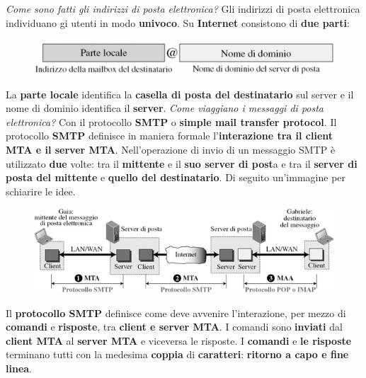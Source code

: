 \documentclass[11pt,a4paper]{article}
\theoremstyle{definition}
\begin{document}
\textit{Come sono fatti gli indirizzi di posta elettronica?}\newline\newline
Gli indirizzi di posta elettronica individuano gi utenti in modo \textbf{univoco}. Su \textbf{Internet} consistono di \textbf{due parti}:
\begin{figure}[!h]
	\includegraphics[scale=0.5]{Immagini/Mail_address.png}
	\centering
\end{figure}\newline
La \textbf{parte locale} identifica la \textbf{casella di posta del destinatario} sul server e il nome di dominio identifica il \textbf{server}.\newline\newline
\textit{Come viaggiano i messaggi di posta elettronica?}\newline\newline
Con il protocollo \textbf{SMTP} o \textbf{simple mail transfer protocol}. Il protocollo \textbf{SMTP} definisce in maniera formale l'\textbf{interazione tra il client MTA e il server MTA}. Nell'operazione di invio di un messaggio SMTP è utilizzato \textbf{due} volte: tra il \textbf{mittente} e il \textbf{suo server di post}a e tra il \textbf{server di posta del mittente} e \textbf{quello del destinatario}. Di seguito un'immagine per schiarire le idee.
\newpage
\begin{figure}[!h]
	\includegraphics[scale=0.7]{Immagini/SMTP.png}
	\centering
\end{figure}
Il \textbf{protocollo SMTP} definisce come deve avvenire l'interazione, per mezzo di \textbf{comandi} e \textbf{risposte}, tra \textbf{client e server MTA}. I comandi sono \textbf{inviati} dal \textbf{client MTA} al \textbf{server MTA} e viceversa le risposte.
I \textbf{comandi} e \textbf{le risposte} terminano tutti con la medesima \textbf{coppia} di \textbf{caratteri}: \textbf{ritorno a capo e fine linea}.\newline
\end{document}
